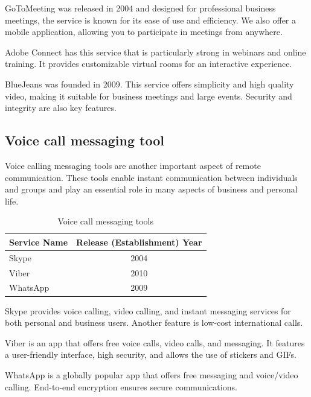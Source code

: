 \documentclass[12pt]{article}
\begin{document}
GoToMeeting was released in 2004 and designed for professional business
meetings, the service is known for its ease of use and efficiency. We also
offer a mobile application, allowing you to participate in meetings from
anywhere.

Adobe Connect has this service that is particularly strong in webinars and
online training. It provides customizable virtual rooms for an interactive
experience.

BlueJeans was founded in 2009. This service offers simplicity and high quality
video, making it suitable for business meetings and large events. Security and
integrity are also key features.

\subsection{Voice call messaging tool}
Voice calling messaging tools are another important aspect of remote
communication. These tools enable instant communication between individuals and
groups and play an essential role in many aspects of business and personal
life.

\begin{table}[h]
    \begin{center}
        \begin{tabular}{|l|c|} \hline
            Service Name & Release (Establishment) Year \\ \hline
            Skype        & 2004                         \\
            Viber        & 2010                         \\
            WhatsApp     & 2009                         \\ \hline
        \end{tabular}
        \caption{Voice call messaging tools}
    \end{center}
\end{table}

Skype provides voice calling, video calling, and instant messaging services for
both personal and business users. Another feature is low-cost international
calls.

Viber is an app that offers free voice calls, video calls, and messaging. It
features a user-friendly interface, high security, and allows the use of
stickers and GIFs.

WhatsApp is a globally popular app that offers free messaging and voice/video
calling. End-to-end encryption ensures secure communications.
\end{document}
